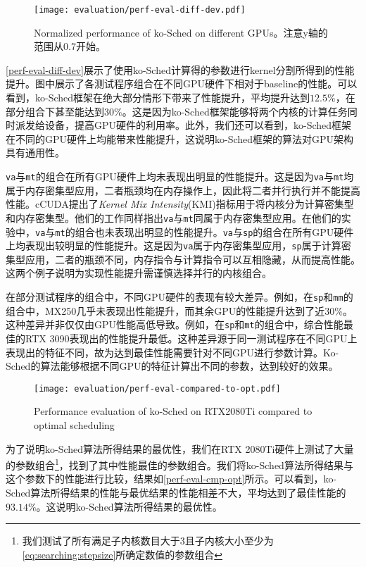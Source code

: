 \begin{figure}[htbp]
    \centering
    \texttt{[image: evaluation/perf-eval-diff-dev.pdf]}
    \caption{Normalized performance of ko-Sched on different GPUs。注意y轴的范围从0.7开始。}
    \label{perf-eval-diff-dev}
\end{figure}

\autoref{perf-eval-diff-dev}展示了使用ko-Sched计算得的参数进行kernel分割所得到的性能提升。图中展示了各测试程序组合在不同GPU硬件下相对于baseline的性能。可以看到，ko-Sched框架在绝大部分情形下带来了性能提升，平均提升达到$12.5\%$，在部分组合下甚至能达到$30\%$。这是因为ko-Sched框架能够将两个内核的计算任务同时派发给设备，提高GPU硬件的利用率。此外，我们还可以看到，ko-Sched框架在不同的GPU硬件上均能带来性能提升，这说明ko-Sched框架的算法对GPU架构具有通用性。

\texttt{va}与\texttt{mt}的组合在所有GPU硬件上均未表现出明显的性能提升。这是因为\texttt{va}与\texttt{mt}均属于内存密集型应用，二者瓶颈均在内存操作上，因此将二者并行执行并不能提高性能。cCUDA\cite{8853389}提出了\emph{Kernel Mix Intensity}(KMI)指标用于将内核分为计算密集型和内存密集型。他们的工作同样指出\texttt{va}与\texttt{mt}同属于内存密集型应用。在他们的实验中，\texttt{va}与\texttt{mt}的组合也未表现出明显的性能提升。\texttt{va}与\texttt{sp}的组合在所有GPU硬件上均表现出较明显的性能提升。这是因为\texttt{va}属于内存密集型应用，\texttt{sp}属于计算密集型应用，二者的瓶颈不同，内存指令与计算指令可以互相隐藏，从而提高性能。这两个例子说明为实现性能提升需谨慎选择并行的内核组合。

在部分测试程序的组合中，不同GPU硬件的表现有较大差异。例如，在\texttt{sp}和\texttt{mm}的组合中，MX250几乎未表现出性能提升，而其余GPU的性能提升达到了近30\%。这种差异并非仅仅由GPU性能高低导致。例如，在\texttt{sp}和\texttt{mt}的组合中，综合性能最佳的RTX 3090表现出的性能提升最低。这种差异源于同一测试程序在不同GPU上表现出的特征不同，故为达到最佳性能需要针对不同GPU进行参数计算。Ko-Sched的算法能够根据不同GPU的特征计算出不同的参数，达到较好的效果。

\begin{figure}[htbp]
    \centering
    \texttt{[image: evaluation/perf-eval-compared-to-opt.pdf]}
    \caption{Performance evaluation of ko-Sched on RTX2080Ti compared to optimal scheduling}
    \label{perf-eval-cmp-opt}
\end{figure}

为了说明ko-Sched算法所得结果的最优性，我们在RTX 2080Ti硬件上测试了大量的参数组合\footnote{我们测试了所有满足子内核数目大于3且子内核大小至少为\autoref{eq:searching:stepsize}所确定数值的参数组合}，找到了其中性能最佳的参数组合。我们将ko-Sched算法所得结果与这个参数下的性能进行比较，结果如\autoref{perf-eval-cmp-opt}所示。可以看到，ko-Sched算法所得结果的性能与最优结果的性能相差不大，平均达到了最佳性能的$93.14\%$。这说明ko-Sched算法所得结果的最优性。

